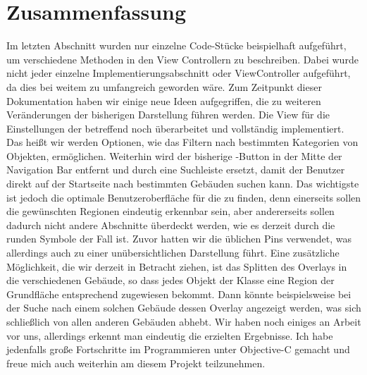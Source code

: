 \documentclass{report}
\begin{document}
\newpage

\chapter{Zusammenfassung}

Im letzten Abschnitt wurden nur einzelne Code-Stücke beispielhaft aufgeführt, um verschiedene Methoden in den View Controllern zu beschreiben. Dabei wurde nicht jeder einzelne Implementierungsabschnitt oder ViewController aufgeführt, da dies bei weitem zu umfangreich geworden wäre. Zum Zeitpunkt dieser Dokumentation haben wir einige neue Ideen aufgegriffen, die zu weiteren Veränderungen der bisherigen Darstellung führen werden. Die View für die Einstellungen der  betreffend noch überarbeitet und vollständig implementiert. Das heißt wir werden Optionen, wie das Filtern nach bestimmten Kategorien von Objekten, ermöglichen. Weiterhin wird der bisherige -Button in der Mitte der Navigation Bar entfernt und durch eine Suchleiste ersetzt, damit der Benutzer direkt auf der Startseite nach bestimmten Gebäuden suchen kann. Das wichtigste ist jedoch die optimale Benutzeroberfläche für die  zu finden, denn einerseits sollen die gewünschten Regionen eindeutig erkennbar sein, aber andererseits sollen dadurch nicht andere Abschnitte überdeckt werden, wie es derzeit durch die runden Symbole der Fall ist. Zuvor hatten wir die üblichen Pins verwendet, was allerdings auch zu einer unübersichtlichen Darstellung führt. Eine zusätzliche Möglichkeit, die wir derzeit in Betracht ziehen, ist das Splitten des Overlays in die verschiedenen Gebäude, so dass jedes Objekt der Klasse  eine Region der Grundfläche entsprechend zugewiesen bekommt. Dann könnte beispielsweise bei der Suche nach einem solchen Gebäude dessen Overlay angezeigt werden, was sich schließlich von allen anderen Gebäuden abhebt. Wir haben noch einiges an Arbeit vor uns, allerdings erkennt man eindeutig die erzielten Ergebnisse. Ich habe jedenfalls große Fortschritte im Programmieren unter Objective-C gemacht und freue mich auch weiterhin am diesem Projekt teilzunehmen.
\end{document}
